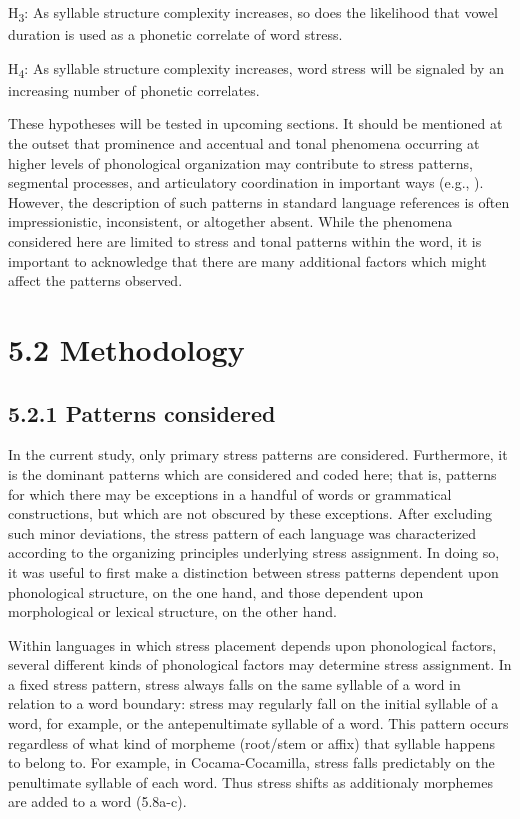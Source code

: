 \ea\label{ex:(5.6)}
  H\textsubscript{3}: As syllable structure complexity increases, so does the likelihood that vowel duration is used as a phonetic correlate of word stress.

\z


\ea\label{ex:(5.7)}
  H\textsubscript{4}: As syllable structure complexity increases, word stress will be signaled by an increasing number of phonetic correlates.
\z



  These hypotheses will be tested in upcoming sections. It should be mentioned at the outset that prominence and accentual and tonal phenomena occurring at higher levels of phonological organization may contribute to stress patterns, segmental processes, and articulatory coordination in important ways (e.g., \citealt{FougeronKeating1997}). However, the description of such patterns in standard language references is often impressionistic, inconsistent, or altogether absent. While the phenomena considered here are limited to stress and tonal patterns within the word, it is important to acknowledge that there are many additional factors which might affect the patterns observed.


\section{5.2 Methodology}
\subsection{5.2.1 Patterns considered}

  In the current study, only primary stress patterns are considered. Furthermore, it is the dominant patterns which are considered and coded here; that is, patterns for which there may be exceptions in a handful of words or grammatical constructions, but which are not obscured by these exceptions. After excluding such minor deviations, the stress pattern of each language was characterized according to the organizing principles underlying stress assignment. In doing so, it was useful to first make a distinction between stress patterns dependent upon phonological structure, on the one hand, and those dependent upon morphological or lexical structure, on the other hand.



   Within languages in which stress placement depends upon phonological factors, several different kinds of phonological factors may determine stress assignment. In a fixed stress pattern, stress always falls on the same syllable of a word in relation to a word boundary: stress may regularly fall on the initial syllable of a word, for example, or the antepenultimate syllable of a word. This pattern occurs regardless of what kind of morpheme (root/stem or affix) that syllable happens to belong to. For example, in Cocama-Cocamilla, stress falls predictably on the penultimate syllable of each word. Thus stress shifts as additionaly morphemes are added to a word (5.8a-c).



